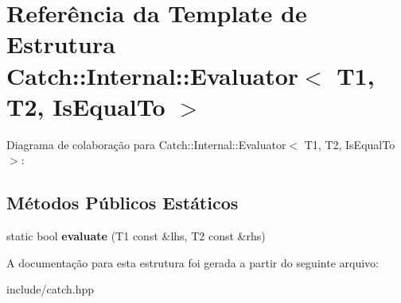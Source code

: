 \hypertarget{structCatch_1_1Internal_1_1Evaluator_3_01T1_00_01T2_00_01IsEqualTo_01_4}{}\section{Referência da Template de Estrutura Catch\+:\+:Internal\+:\+:Evaluator$<$ T1, T2, Is\+Equal\+To $>$}
\label{structCatch_1_1Internal_1_1Evaluator_3_01T1_00_01T2_00_01IsEqualTo_01_4}


Diagrama de colaboração para Catch\+:\+:Internal\+:\+:Evaluator$<$ T1, T2, Is\+Equal\+To $>$\+:
\subsection*{Métodos Públicos Estáticos}
\begin{DoxyCompactItemize}
\item 
static bool {\bfseries evaluate} (T1 const \&lhs, T2 const \&rhs)\hypertarget{structCatch_1_1Internal_1_1Evaluator_3_01T1_00_01T2_00_01IsEqualTo_01_4_a166b2b7849247397e63fb2940481b217}{}\label{structCatch_1_1Internal_1_1Evaluator_3_01T1_00_01T2_00_01IsEqualTo_01_4_a166b2b7849247397e63fb2940481b217}

\end{DoxyCompactItemize}


A documentação para esta estrutura foi gerada a partir do seguinte arquivo\+:\begin{DoxyCompactItemize}
\item 
include/catch.\+hpp\end{DoxyCompactItemize}
